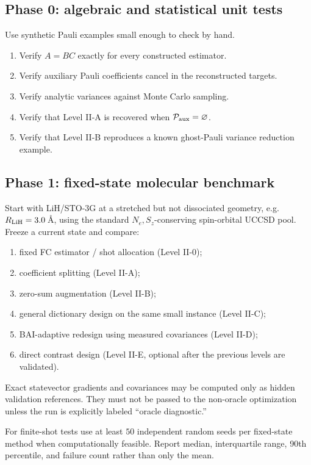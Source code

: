 \documentclass[11pt]{article}
\newcommand{\Pset}{\mathcal P}
\begin{document}
\subsection{Phase 0: algebraic and statistical unit tests}
Use synthetic Pauli examples small enough to check by hand.
\begin{enumerate}[label=(\alph*)]
  \item Verify $A=BC$ exactly for every constructed estimator.
  \item Verify auxiliary Pauli coefficients cancel in the reconstructed targets.
  \item Verify analytic variances against Monte Carlo sampling.
  \item Verify that Level II-A is recovered when $\Pset_{\rm aux}=\varnothing$.
  \item Verify that Level II-B reproduces a known ghost-Pauli variance reduction example.
\end{enumerate}

\subsection{Phase 1: fixed-state molecular benchmark}
Start with LiH/STO-3G at a stretched but not dissociated geometry, e.g. $R_{\rm LiH}=3.0\,$\AA, using the standard $N_e,S_z$-conserving spin-orbital UCCSD pool.  Freeze a current state and compare:
\begin{enumerate}[label=\textbf{B\arabic*.}]
  \item fixed FC estimator / shot allocation (Level II-0);
  \item coefficient splitting (Level II-A);
  \item zero-sum augmentation (Level II-B);
  \item general dictionary design on the same small instance (Level II-C);
  \item BAI-adaptive redesign using measured covariances (Level II-D);
  \item direct contrast design (Level II-E, optional after the previous levels are validated).
\end{enumerate}

Exact statevector gradients and covariances may be computed only as hidden validation references.  They must not be passed to the non-oracle optimization unless the run is explicitly labeled ``oracle diagnostic.''

For finite-shot tests use at least $50$ independent random seeds per fixed-state method when computationally feasible.  Report median, interquartile range, 90th percentile, and failure count rather than only the mean.
\end{document}
